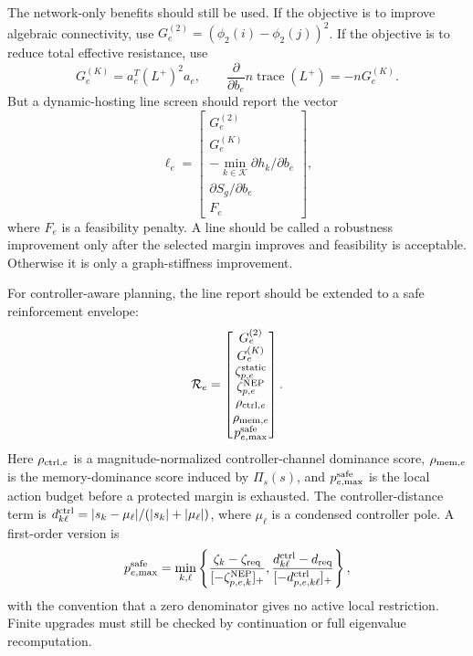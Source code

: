The network-only benefits should still be used. If the objective is to improve
algebraic connectivity, use \(G_e^{(2)}=(\phi_2(i)-\phi_2(j))^2\). If the
objective is to reduce total effective resistance, use
\begin{equation}
  G_e^{(K)}
  =
  a_e^T(L^+)^2a_e,
  \qquad
  \frac{\partial}{\partial b_e}
  n\operatorname{trace}(L^+)
  =
  -nG_e^{(K)}.
  \label{eq:effective_resistance_line_gain}
\end{equation}
But a dynamic-hosting line screen should report the vector
\begin{equation}
  \ell_e
  =
  \begin{bmatrix}
  G_e^{(2)}\\
  G_e^{(K)}\\
  -\min_{k\in\mathcal K}\partial h_k/\partial b_e\\
  \partial S_g/\partial b_e\\
  F_e
  \end{bmatrix},
  \label{eq:line_screen_vector}
\end{equation}
where \(F_e\) is a feasibility penalty. A line should be called a robustness
improvement only after the selected margin improves and feasibility is
acceptable. Otherwise it is only a graph-stiffness improvement.

For controller-aware planning, the line report should be extended to a safe
reinforcement envelope:
\begin{equation}
  \mathcal R_e
  =
  \begin{bmatrix}
  G_e^{(2)}\\
  G_e^{(K)}\\
  \zeta_{p,e}^{\rm static}\\
  \zeta_{p,e}^{\rm NEP}\\
  \rho_{{\rm ctrl},e}\\
  \rho_{{\rm mem},e}\\
  p_{e,\max}^{\rm safe}
  \end{bmatrix}.
  \label{eq:line_safe_reinforcement_envelope}
\end{equation}
Here \(\rho_{{\rm ctrl},e}\) is a magnitude-normalized controller-channel
dominance score, \(\rho_{{\rm mem},e}\) is the memory-dominance score induced
by \(\Pi_s(s)\), and \(p_{e,\max}^{\rm safe}\) is the local action budget before
a protected margin is exhausted. The controller-distance term is
\(d^{\rm ctrl}_{k\ell}=|s_k-\mu_\ell|/(|s_k|+|\mu_\ell|)\), where
\(\mu_\ell\) is a condensed controller pole. A first-order version is
\begin{equation}
  p_{e,\max}^{\rm safe}
  =
  \min_{k,\ell}
  \left\{
  \frac{\zeta_k-\zeta_{\rm req}}
       {[-\zeta_{p,e,k}^{\rm NEP}]_+},
  \frac{d^{\rm ctrl}_{k\ell}-d_{\rm req}}
       {[-d_{p,e,k\ell}^{\rm ctrl}]_+}
  \right\},
  \label{eq:line_safe_reinforcement_budget}
\end{equation}
with the convention that a zero denominator gives no active local restriction.
Finite upgrades must still be checked by continuation or full eigenvalue
recomputation.


